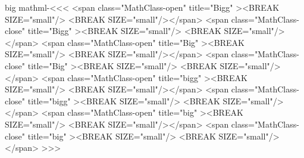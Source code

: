{\<big mathml-\><<<
   {\bgroup
          {<span class="MathClass-open" title="Bigg" ><BREAK SIZE="small"/>}
          {<BREAK SIZE="small"/></span>}
          {}%
   }
   {\egroup}
   {\bgroup
          {<span class="MathClass-close" title="Bigg" ><BREAK SIZE="small"/>}
          {<BREAK SIZE="small"/></span>}
          {}%
   }
   {\egroup}
   {\bgroup
          {<span class="MathClass-open" title="Big" ><BREAK SIZE="small"/>}
          {<BREAK SIZE="small"/></span>}
          {}%
   }
   {\egroup}
   {\bgroup
          {<span class="MathClass-close" title="Big" ><BREAK SIZE="small"/>}
          {<BREAK SIZE="small"/></span>}
          {}%
   }
   {\egroup}
   {\bgroup
          {<span class="MathClass-open" title="bigg" ><BREAK SIZE="small"/>}
          {<BREAK SIZE="small"/></span>}
          {}%
   }
   {\egroup}
   {\bgroup
          {<span class="MathClass-close" title="bigg" ><BREAK SIZE="small"/>}
          {<BREAK SIZE="small"/></span>}
          {}%
   }
   {\egroup}
   {\bgroup
          {<span class="MathClass-open" title="big" ><BREAK SIZE="small"/>}
          {<BREAK SIZE="small"/></span>}
          {}%
   }
   {\egroup}
   {\bgroup
          {<span class="MathClass-close" title="big" ><BREAK SIZE="small"/>}
          {<BREAK SIZE="small"/></span>}
          {}%
   }
   {\egroup}
>>>



}
